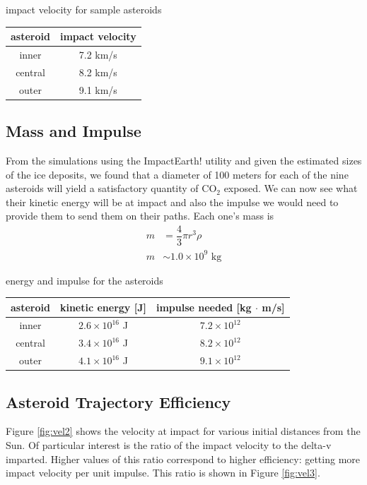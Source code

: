\documentclass[a4paper]{article}
\begin{document}
	\begin{center}
		impact velocity for sample asteroids
		
		\begin{tabular}{c|c}
			asteroid & impact velocity \\ \hline
			inner      & 7.2 km/s \\ \hline
			central      & 8.2 km/s \\ \hline
			outer      & 9.1 km/s
		\end{tabular}
	\end{center}
    
    \subsection{Mass and Impulse}
    From the simulations using the ImpactEarth! utility and given the estimated sizes of the ice deposits, we found that a diameter of 100 meters for each of the nine asteroids will yield a satisfactory quantity of CO$_2$ exposed. We can now see what their kinetic energy will be at impact and also the impulse we would need to provide them to send them on their paths. Each one's mass is
    \begin{align*}
    m &= \dfrac{4}{3} \pi r^3 \rho \\
    m &\sim 1.0 \times 10^9 \text{ kg}
    \end{align*}
    
	\begin{center}
		energy and impulse for the asteroids
		
		\begin{tabular}{c|c|c}
			asteroid & kinetic energy [J] & impulse needed [kg $\cdot$ m/s] \\ \hline
			inner      & $2.6 \times 10^{16}$ J & $7.2 \times 10^{12}$ \\ \hline
			central      & $3.4 \times 10^{16}$ J & $8.2 \times 10^{12}$ \\ \hline
			outer      & $4.1 \times 10^{16}$ J & $9.1 \times 10^{12}$
		\end{tabular}
	\end{center}
    
	\subsection{Asteroid Trajectory Efficiency}
	
	Figure \ref{fig:vel2} shows the velocity at impact for various initial distances from the Sun. Of particular interest is the ratio of the impact velocity to the delta-v imparted. Higher values of this ratio correspond to higher efficiency: getting more impact velocity per unit impulse. This ratio is shown in Figure \ref{fig:vel3}.
	
\end{document}
